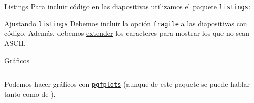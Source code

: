 \begin{frame}{Listings}
  Para incluir código en las diapositivas utilizamos el paquete
  \href{https://www.ctan.org/tex-archive/macros/latex/contrib/listings}{\texttt{listings}}:
  \espacio
  \espacio
  \pause
  \begin{alertblock}{Ajustando \texttt{listings}}
    Debemos incluir la opción \texttt{fragile} a las diapositivas con código.
    Además, debemos \href{http://tex.stackexchange.com/questions/24528}{extender}
    los caracteres para mostrar los que no sean ASCII.
  \end{alertblock}
\end{frame}

\begin{frame}{Gráficos}
\hypertarget{graphs}{}
  \begin{columns}[c]

     Podemos hacer gráficos con \href{https://ctan.org/pkg/pgfplots}{\texttt{pgfplots}}
     (aunque de este paquete se puede hablar tanto como de \beamer).
  \end{columns}
\end{frame}

